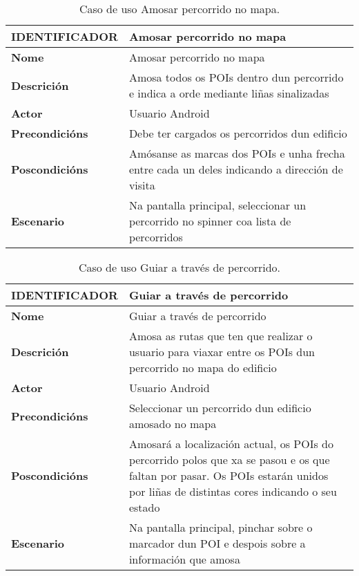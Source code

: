 \begin{table}[tbh]
	\footnotesize
	\centering
	\begin{tabular}{|l|p{10cm}|}
		\hline 
		\textbf{IDENTIFICADOR}	& \textbf{Amosar percorrido no mapa} \\ 
		\hline 
		\textbf{Nome} & Amosar percorrido no mapa \\ 
		\hline 
		\textbf{Descrición} & Amosa todos os POIs dentro dun percorrido e indica a orde mediante liñas sinalizadas \\ 
		\hline 
		\textbf{Actor} & Usuario Android \\ 
		\hline 
		\textbf{Precondicións} & Debe ter cargados os percorridos dun edificio \\ 
		\hline 
		\textbf{Poscondicións} & Amósanse as marcas dos POIs e unha frecha entre cada un deles indicando a dirección de visita \\ 
		\hline 
		\textbf{Escenario} & Na pantalla principal, seleccionar un percorrido no spinner coa lista de percorridos \\ 
		\hline 
	\end{tabular}
	\caption{Caso de uso Amosar percorrido no mapa.}
	\label{tab:cuAmosarPercorridoMapa}
\end{table}

\begin{table}[tbh]
	\footnotesize
	\centering
	\begin{tabular}{|l|p{10cm}|}
		\hline 
		\textbf{IDENTIFICADOR}	& \textbf{Guiar a través de percorrido} \\ 
		\hline 
		\textbf{Nome} & Guiar a través de percorrido \\ 
		\hline 
		\textbf{Descrición} & Amosa as rutas que ten que realizar o usuario para viaxar entre os POIs dun percorrido no mapa do edificio \\ 
		\hline 
		\textbf{Actor} & Usuario Android \\ 
		\hline 
		\textbf{Precondicións} & Seleccionar un percorrido dun edificio amosado no mapa \\ 
		\hline 
		\textbf{Poscondicións} & Amosará a localización actual, os POIs do percorrido polos que xa se pasou e os que faltan por pasar. Os POIs estarán unidos por liñas de distintas cores indicando o seu estado \\ 
		\hline 
		\textbf{Escenario} & Na pantalla principal, pinchar sobre o marcador dun POI e despois sobre a información que amosa \\ 
		\hline 
	\end{tabular}
	\caption{Caso de uso Guiar a través de percorrido.}
	\label{tab:cuGuiarPercorrido}
\end{table}

